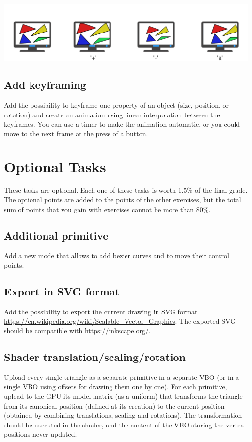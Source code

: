 \documentclass[11pt]{article}
\begin{document}
\includegraphics[width=1\textwidth]{view.pdf}

\subsection{Add keyframing}

Add the possibility to keyframe one property of an object (size,  position, or rotation) and create an animation using linear interpolation between the keyframes. You can use a timer to make the animation automatic, or you could move to the next frame at the press of a button.

\section*{Optional Tasks}

These tasks are optional. Each one of these tasks is worth 1.5\% of the final grade. The optional points are added to the points of the other exercises, but the total sum of points that you gain with exercises cannot be more than 80\%.

\subsection{Additional primitive}

Add a new mode that allows to add bezier curves and to move their control points.

\subsection{Export in SVG format}

Add the possibility to export the current drawing in SVG format \url{https://en.wikipedia.org/wiki/Scalable_Vector_Graphics}. The exported SVG should be compatible with \url{https://inkscape.org/}.

\subsection{Shader translation/scaling/rotation}
\label{sec:shader}
Upload every single triangle as a separate primitive in a separate VBO (or in a single VBO using offsets for drawing them one by one). For each primitive, upload to the GPU its model matrix (as a uniform) that transforms the triangle from its canonical position (defined at its creation) to the current position (obtained by combining translations, scaling and rotations). The transformation should be executed in the shader, and the content of the VBO storing the vertex positions never updated.

%
%
\end{document}
